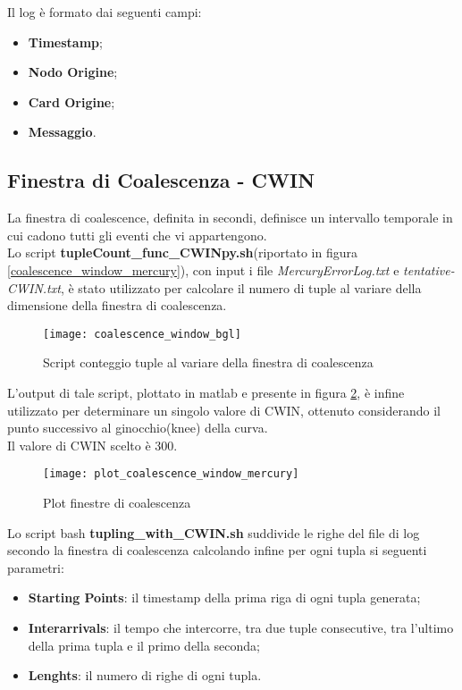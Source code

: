 Il log è formato dai seguenti campi:
\begin{itemize}
  \item \textbf{Timestamp};
  \item \textbf{Nodo Origine};
  \item \textbf{Card Origine};
  \item \textbf{Messaggio}.
\end{itemize}

\subsection{Finestra di Coalescenza - CWIN}
La finestra di coalescence, definita in secondi, definisce un intervallo temporale
in cui cadono tutti gli eventi che vi appartengono.\\
Lo script \textbf{tupleCount\_func\_CWINpy.sh}(riportato in figura \ref{coalescence_window_mercury}), con input i file \textit{MercuryErrorLog.txt}
e \textit{tentative-CWIN.txt}, è stato utilizzato per calcolare il numero di tuple al
variare della dimensione della finestra di coalescenza.\\

\begin{figure}[!htbp]
  \texttt{[image: coalescence\_window\_bgl]}
  \caption{Script conteggio tuple al variare della finestra di coalescenza}
  \label{coalescence_window_bgl}
\end{figure}

\clearpage

L'output di tale script, plottato in matlab e presente in figura \ref{plot_coalescence_window_mercury},
è infine utilizzato per determinare un singolo valore di CWIN, ottenuto
considerando il punto successivo al ginocchio(knee) della curva.\\
Il valore di CWIN scelto è 300.\\
\begin{figure}[!htbp]
  \texttt{[image: plot\_coalescence\_window\_mercury]}
  \caption{Plot finestre di coalescenza}
  \label{plot_coalescence_window_mercury}
\end{figure}

Lo script bash \textbf{tupling\_with\_CWIN.sh} suddivide le righe del file di log
secondo la finestra di coalescenza calcolando infine per ogni tupla si seguenti parametri:

\begin{itemize}
  \item \textbf{Starting Points}: il timestamp della prima riga di ogni tupla generata;
  \item \textbf{Interarrivals}: il tempo che intercorre, tra due tuple consecutive, tra l'ultimo
  della prima tupla e il primo della seconda;
  \item \textbf{Lenghts}: il numero di righe di ogni tupla.
\end{itemize}

